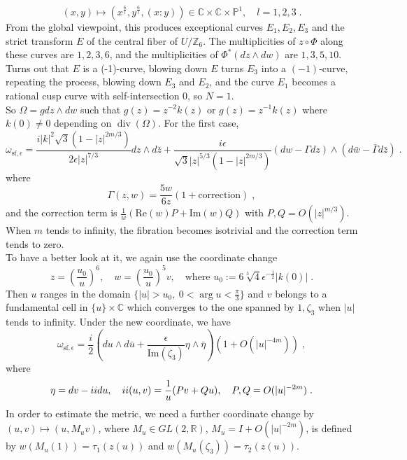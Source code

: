 $$(x,y)\mapsto (x^{\frac{6}{l}},y^{\frac{6}{l}},(x:y))\in \mathbb{C}\times\mathbb{C}\times\mathbb{P}^1,\quad l=1,2,3\; .$$
\indent From the global viewpoint, this produces exceptional curves $E_1,E_2,E_3$ and the strict transform $E$ of the central fiber of $U/\mathbb{Z}_6$. The multiplicities of $z\circ\Phi$ along these curves are $1,2,3,6$, and the multiplicities of $\Phi^*(dz\wedge dw)$ are $1,3,5,10$.\\ \indent
Turns out that $E$ is a (-1)-curve, blowing down $E$ turns $E_3$ into a $(-1)$-curve, repeating the process, blowing down $E_3$ and $E_2$, and the curve $E_1$ becomes a rational cusp curve with self-intersection 0, so $N=1$.\\ \indent
So $\Omega=gdz\wedge dw$ such that $g(z)=z^{-2}k(z)$ or $g(z)=z^{-1}k(z)$ where $k(0)\neq 0$ depending on $\operatorname{div}(\Omega)$. For the first case,
$$\omega_{\textrm{sf},\epsilon}=\frac{i|k|^2\sqrt{3}(1-|z|^{2m/3})}{2\epsilon|z|^{7/3}}dz\wedge d\bar{z}+\frac{i\epsilon}{\sqrt{3}|z|^{5/3}(1-|z|^{2m/3})}(dw-\Gamma dz)\wedge(d\bar{w}-\bar{\Gamma}d\bar{z})\; .$$
where
$$\Gamma(z,w)=\frac{5w}{6z}(1+\textrm{correction})\; ,$$
and the correction term is $\frac{1}{w}(\textrm{Re}(w)P+\textrm{Im}(w)Q)$ with $P,Q=O(|z|^{m/3})$. When $m$ tends to infinity, the fibration becomes isotrivial and the correction term tends to zero.\\ \indent
To have a better look at it, we again use the coordinate change
$$z=\left(\frac{u_0}{u}\right)^6,\quad w=\left(\frac{u_0}{u}\right)^5v,\quad \textrm{where }u_0:=6\sqrt[3]{4}\epsilon^{-\frac{1}{2}}|k(0)|\; .$$
\indent Then $u$ ranges in the domain $\{|u|>u_0,~0<\arg u<\frac{\pi}{3}\}$ and $v$ belongs to a fundamental cell in $\{u\}\times\mathbb{C}$ which converges to the one spanned by $1,\zeta_3$ when $|u|$ tends to infinity. Under the new coordinate, we have
$$\omega_{\textrm{sf},\epsilon}=\frac{i}{2}\left(du\wedge d\bar{u}+\frac{\epsilon}{\textrm{Im}(\zeta_3)}\eta\wedge\bar{\eta}\right)(1+O(|u|^{-4m}))\; ,$$
where
$$\eta=dv-\uppercase\expandafter{\romannumeral2}du,\quad \uppercase\expandafter{\romannumeral2}(u,v)=\frac{1}{u}(Pv+Qu),\quad P,Q=O(|u|^{-2m})\; .$$
\indent In order to estimate the metric, we need a further coordinate change by $(u,v)\mapsto(u,M_uv)$, where $M_u\in GL(2,\mathbb{R})$, $M_u=I+O(|u|^{-2m})$, is defined by $w(M_u(1))=\tau_1(z(u))$ and $w(M_u(\zeta_3))=\tau_2(z(u))$.\\ \indent
